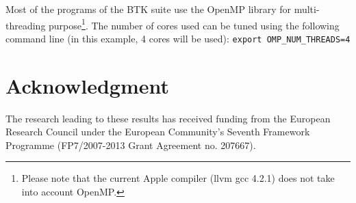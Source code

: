 \documentclass[a4paper,10pt]{article}
\begin{document}
Most of the programs of the BTK suite use the OpenMP library for multi-threading
purpose\footnote{Please note that the current Apple compiler (llvm gcc 4.2.1) does not take into account OpenMP.}. The number of cores used can be tuned using the following command line
(in this example, 4 cores will be used): \texttt{export OMP\_NUM\_THREADS=4}




\section*{Acknowledgment}
\small{The research leading to these results has received funding from the
European Research Council under the European Community’s Seventh Framework
Programme (FP7/2007-2013 Grant Agreement no. 207667).}



\end{document}

